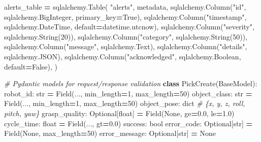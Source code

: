 \documentclass[
]{article}
\newenvironment{Shaded}{\begin{snugshade}}{\end{snugshade}}
\newcommand{\BuiltInTok}[1]{#1}
\newcommand{\CommentTok}[1]{\textcolor[rgb]{0.56,0.35,0.01}{\textit{#1}}}
\newcommand{\DecValTok}[1]{\textcolor[rgb]{0.00,0.00,0.81}{#1}}
\newcommand{\FloatTok}[1]{\textcolor[rgb]{0.00,0.00,0.81}{#1}}
\newcommand{\KeywordTok}[1]{\textcolor[rgb]{0.13,0.29,0.53}{\textbf{#1}}}
\newcommand{\NormalTok}[1]{#1}
\newcommand{\OperatorTok}[1]{\textcolor[rgb]{0.81,0.36,0.00}{\textbf{#1}}}
\newcommand{\StringTok}[1]{\textcolor[rgb]{0.31,0.60,0.02}{#1}}
\newcommand{\VariableTok}[1]{\textcolor[rgb]{0.00,0.00,0.00}{#1}}
\begin{document}
\begin{Shaded}
\begin{Highlighting}[]
\NormalTok{alerts\_table }\OperatorTok{=}\NormalTok{ sqlalchemy.Table(}
    \StringTok{"alerts"}\NormalTok{,}
\NormalTok{    metadata,}
\NormalTok{    sqlalchemy.Column(}\StringTok{"id"}\NormalTok{, sqlalchemy.BigInteger, primary\_key}\OperatorTok{=}\VariableTok{True}\NormalTok{),}
\NormalTok{    sqlalchemy.Column(}\StringTok{"timestamp"}\NormalTok{, sqlalchemy.DateTime, default}\OperatorTok{=}\NormalTok{datetime.utcnow),}
\NormalTok{    sqlalchemy.Column(}\StringTok{"severity"}\NormalTok{, sqlalchemy.String(}\DecValTok{20}\NormalTok{)),}
\NormalTok{    sqlalchemy.Column(}\StringTok{"category"}\NormalTok{, sqlalchemy.String(}\DecValTok{50}\NormalTok{)),}
\NormalTok{    sqlalchemy.Column(}\StringTok{"message"}\NormalTok{, sqlalchemy.Text),}
\NormalTok{    sqlalchemy.Column(}\StringTok{"details"}\NormalTok{, sqlalchemy.JSON),}
\NormalTok{    sqlalchemy.Column(}\StringTok{"acknowledged"}\NormalTok{, sqlalchemy.Boolean, default}\OperatorTok{=}\VariableTok{False}\NormalTok{),}
\NormalTok{)}

\CommentTok{\# Pydantic models for request/response validation}
\KeywordTok{class}\NormalTok{ PickCreate(BaseModel):}
\NormalTok{    robot\_id: }\BuiltInTok{str} \OperatorTok{=}\NormalTok{ Field(..., min\_length}\OperatorTok{=}\DecValTok{1}\NormalTok{, max\_length}\OperatorTok{=}\DecValTok{50}\NormalTok{)}
\NormalTok{    object\_class: }\BuiltInTok{str} \OperatorTok{=}\NormalTok{ Field(..., min\_length}\OperatorTok{=}\DecValTok{1}\NormalTok{, max\_length}\OperatorTok{=}\DecValTok{50}\NormalTok{)}
\NormalTok{    object\_pose: }\BuiltInTok{dict}  \CommentTok{\# \{x, y, z, roll, pitch, yaw\}}
\NormalTok{    grasp\_quality: Optional[}\BuiltInTok{float}\NormalTok{] }\OperatorTok{=}\NormalTok{ Field(}\VariableTok{None}\NormalTok{, ge}\OperatorTok{=}\FloatTok{0.0}\NormalTok{, le}\OperatorTok{=}\FloatTok{1.0}\NormalTok{)}
\NormalTok{    cycle\_time: }\BuiltInTok{float} \OperatorTok{=}\NormalTok{ Field(..., gt}\OperatorTok{=}\FloatTok{0.0}\NormalTok{)}
\NormalTok{    success: }\BuiltInTok{bool}
\NormalTok{    error\_code: Optional[}\BuiltInTok{str}\NormalTok{] }\OperatorTok{=}\NormalTok{ Field(}\VariableTok{None}\NormalTok{, max\_length}\OperatorTok{=}\DecValTok{50}\NormalTok{)}
\NormalTok{    error\_message: Optional[}\BuiltInTok{str}\NormalTok{] }\OperatorTok{=} \VariableTok{None}


\end{Highlighting}
\end{Shaded}
\end{document}
